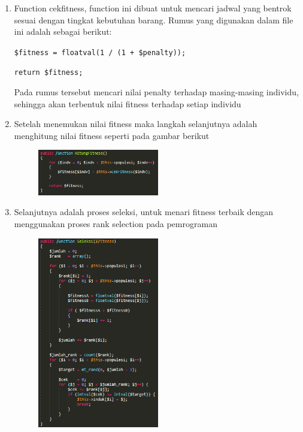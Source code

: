 \begin{enumerate}
	\item Function cekfitness, function ini dibuat untuk mencari jadwal yang bentrok sesuai dengan tingkat kebutuhan barang. Rumus yang digunakan dalam file ini adalah sebagai berikut:
	\par \verb|$fitness = floatval(1 / (1 + $penalty));|
	\par \verb|return $fitness;|
	\par Pada rumus tersebut mencari nilai penalty terhadap masing-masing individu, sehingga akan terbentuk nilai fitness terhadap setiap individu
	
	\item Setelah menemukan nilai fitness maka langkah selanjutnya adalah menghitung nilai fitness seperti pada gambar berikut
		\begin{figure}[!htbp]
    		\centering
    		\includegraphics[width=0.5\textwidth]{figures/GA3.PNG}
    		\label{GA3}
		\end{figure}
		
	\item Selanjutnya adalah proses seleksi, untuk menari fitness terbaik dengan menggunakan proses rank selection pada pemrograman
		\begin{figure}[!htbp]
    		\centering
    		\includegraphics[width=0.5\textwidth]{figures/GA4.PNG}
    		\label{GA4}
		\end{figure}
		

\end{enumerate}
